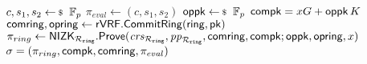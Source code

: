 \begin{algorithm}
	\eprint{}{\scriptsize}
	\caption{$\Gen_{sign}(\ring,x,\pk,\aux,\msg)$}
	\label{alg:gensign}	 	
	\begin{algorithmic}[1]
			\State $ c,s_1, s_2 \leftsample \F_p $
			\State $ \pi_{eval}  \leftarrow (c,s_1, s_2)$
			\State $ \openpk \leftsample \F_p $
			\State $ \mathsf{compk} =  x G + \mathsf{oppk} \, K$
			\State $ \mathsf{comring}, \mathsf{opring} \leftarrow {\ensuremath{\mathsf{rVRF}}}.{\mathsf{CommitRing}}(\mathsf{ring}, \mathsf{pk}) $ \label{line:comring}
			\State $ \pi_{ring} \leftarrow {\ensuremath{\mathsf{NIZK}}}_{\mathcal{R}_{\mathtt{ring}}}.{\mathsf{Prove}}(\mathit{crs}_{\mathcal{R}_{\mathtt{ring}}}, \mathit{pp}_{\mathcal{R}_{\mathtt{ring}}}, \mathsf{comring}, \mathsf{compk}; \mathsf{oppk}, \mathsf{opring}, x) $ \label{line:piring}
			\State\Return$ \sigma = (\pi_{ring},\mathsf{compk},\mathsf{comring},\pi_{eval}) $
		\end{algorithmic}
	
\end{algorithm}
%
%
